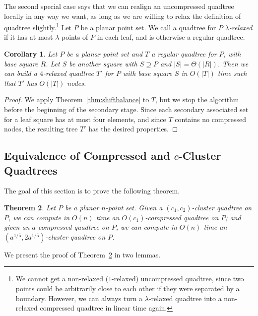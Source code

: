 \documentclass[11pt]{paper}
\newtheorem {theorem} {Theorem}[section]
\newtheorem {cor}[theorem] {Corollary}
\begin{document}
    The second special case says that we can realign an uncompressed 
    quadtree locally in any way we want, as long as we are willing
    to relax the definition of quadtree slightly.\footnote
    {We cannot get a non-relaxed ($1$-relaxed) uncompressed quadtree, since two points could be arbitrarily close to each other if they were separated by a boundary. However, we can always turn a $\lambda$-relaxed quadtree into a non-relaxed compressed quadtree in linear time again.}
    Let $P$ be a planar point set.
    We call a quadtree for $P$ \emph {$\lambda$-relaxed} if it has at most
    $\lambda$ points of $P$ in each leaf, and is otherwise a regular quadtree.
    \begin {cor} \label {cor:qt-shift}
      Let $P$ be a planar point set and $T$ a regular quadtree for $P$, 
      with base square $R$.
      Let $S$ be another square with $S \supseteq P$ and 
      $|S| = \Theta(|R|)$.
      Then we can build a $4$-relaxed quadtree $T'$ for $P$ 
      with base square $S$ in $O(|T|)$ time such that
      $T'$ has $O(|T|)$ nodes.      
    \end {cor}

   \begin{proof}
      We apply Theorem~\ref{thm:shiftbalance} to $T$, but we stop the
      algorithm before the beginning of the secondary stage.
      Since each secondary associated set for a leaf square has
      at most four elements, and since $T$ contains no compressed
      nodes, the resulting tree $T'$ has the desired properties.
   \end{proof}


\subsection{Equivalence of Compressed and $c$-Cluster Quadtrees}
\label{sec:compressed-c-cluster}

    The goal of this section is to prove the following theorem.
    \begin{theorem}\label{thm:cluster-compressed-equiv}
      Let $P$ be a planar $n$-point set.  Given a
      $(c_1, c_2)$-cluster quadtree on $P$, we can compute in $O(n)$ time an
      $O(c_1)$-compressed quadtree on $P$; and given an $a$-compressed
      quadtree on $P$, we can compute in $O(n)$ time an
      $(a^{1/5}, 2a^{1/5})$-cluster quadtree on $P$.
    \end{theorem}
   
    We present the proof of Theorem~\ref{thm:cluster-compressed-equiv}
    in two lemmas.
\end{document}
